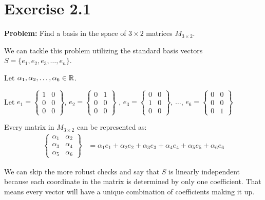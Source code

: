 \section*{Exercise 2.1} 
\textbf{Problem:} Find a basis in the space of $3 \times 2$ matrices $M_{3 \times 2}$.

We can tackle this problem utilizing the standard basis vectors $S = \{e_{1}, e_{2}, e_{3}, \dots, e_{n}\}$. 

Let $\alpha_1, \alpha_2, \dots, \alpha_6 \in \mathbb{R}$.

Let $e_{1} = 
\begin{Bmatrix}
	1 & 0 \\
	0 & 0 \\
	0 & 0
\end{Bmatrix}
$, 
$e_{2} = 
\begin{Bmatrix}
	0 & 1 \\
	0 & 0 \\
	0 & 0
\end{Bmatrix}$
,
$e_{3} = 
\begin{Bmatrix}
	0 & 0 \\
	1 & 0 \\
	0 & 0
\end{Bmatrix}$,
$\dots$,
$e_{6} = 
\begin{Bmatrix}
	0 & 0 \\
	0 & 0 \\
	0 & 1 
\end{Bmatrix}$

Every matrix in $M_{3 \times 2}$ can be represented as:
\[\begin{aligned}
	\begin{Bmatrix}
	\alpha_1 & \alpha_2 \\
	\alpha_3 & \alpha_4 \\
	\alpha_5 & \alpha_6
\end{Bmatrix}
&= \alpha_{1} e_{1} + \alpha_{2} e_{2} + \alpha_{3} e_{3} + \alpha_{4} e_{4} + \alpha_{5} e_{5} + \alpha_{6} e_{6} 
\end{aligned}\]

We can skip the more robust checks and say that $S$ is linearly independent because each coordinate in the matrix is determined by only one coefficient. That means every vector will have a unique combination of coefficients making it up.  
